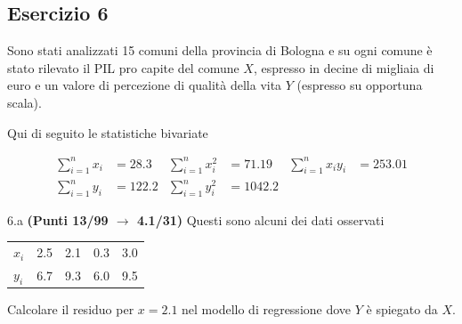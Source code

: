 \documentclass[
  11pt,
]{book}
\theoremstyle{mytheoremstyle}
\theoremstyle{mydefstyle}
\begin{document}
\subsection{Esercizio 6}\label{esercizio-6-16}

Sono stati analizzati 15 comuni della provincia di Bologna e su ogni comune è stato rilevato
il PIL pro capite del comune \(X\), espresso in decine di migliaia di euro e un valore di percezione di
qualità della vita \(Y\) (espresso su opportuna scala).

Qui di seguito le statistiche bivariate

\begin{align}
  \sum_{i=1}^n x_i &= 28.3 &\sum_{i=1}^n x_i^2 &= 71.19 &\sum_{i=1}^n x_i y_i &= 253.01\\
  \sum_{i=1}^n y_i &= 122.2 & \sum_{i=1}^n y_i^2 &= 1042.2 &
\end{align}

6.a \textbf{(Punti 13/99 \(\rightarrow\) 4.1/31)} Questi sono alcuni dei dati osservati

\begin{table}[H]
\centering
\begin{tabular}{lrrrr}
\toprule
  &  &  &  & \\
\midrule
$x_i$ & 2.5 & 2.1 & 0.3 & 3.0\\
$y_i$ & 6.7 & 9.3 & 6.0 & 9.5\\
\bottomrule
\end{tabular}
\end{table}

Calcolare il residuo per \(x=2.1\) nel modello di regressione dove \(Y\) è spiegato da \(X\).
\end{document}

